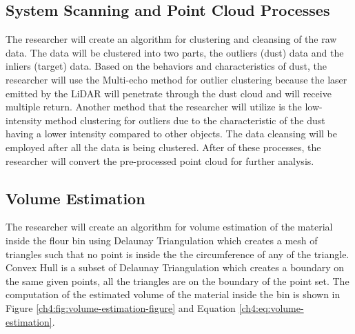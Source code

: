 



\subsection{System Scanning and Point Cloud Processes}

The researcher will create an algorithm for clustering and cleansing of the raw data. The data will be clustered into two parts, the outliers (dust) data and the inliers (target) data. Based on the behaviors and characteristics of dust, the researcher will use the Multi-echo method for outlier clustering because the laser emitted by the LiDAR will penetrate through the dust cloud and will receive multiple return. Another method that the researcher will utilize is the low-intensity method clustering for outliers due to the characteristic of the dust having a lower intensity compared to other objects. The data cleansing will be employed after all the data is being clustered. After of these processes, the researcher will convert the pre-processed point cloud for further analysis.

\subsection{Volume Estimation}
\label{ch4:sec:Volume Estimation}
The researcher will create an algorithm for volume estimation of the material inside the flour bin using Delaunay Triangulation which creates a mesh of triangles such that no point is inside the the circumference of any of the triangle. Convex Hull is a subset of Delaunay Triangulation which creates a boundary on the same given points, all the triangles are on the boundary of the point set. The computation of the estimated volume of the material inside the bin is shown in Figure \ref{ch4:fig:volume-estimation-figure} and Equation \eqref{ch4:eq:volume-estimation}.

